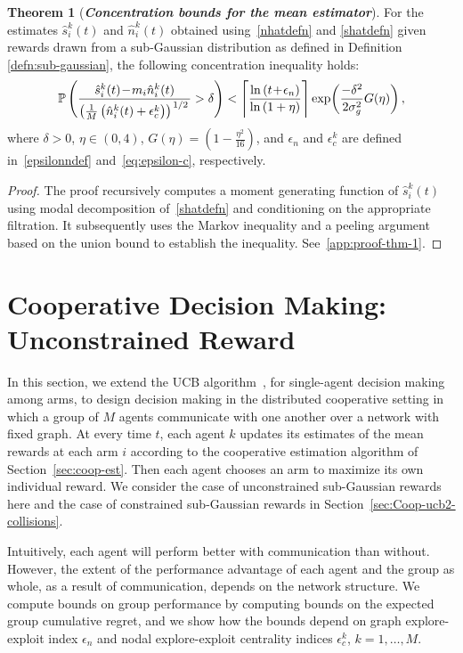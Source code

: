 \documentclass[final,5p,times,twocolumn]{elsarticle}
\theoremstyle{definition}
\newtheorem{theorem}{Theorem}
\newcommand{\slfrac}[2]{\left.#1\middle/#2\right.}
\newcommand{\lnn}[1]{%
	\ln  \left(#1\right)%
}
\newcommand{\expp}[1]{%
	\exp \! \left(#1\right)%
}
\newcommand\bit[1]{\textit{\textbf{#1}}}
\begin{document}
\begin{theorem}[\bit{Concentration bounds for the mean estimator}] \label{thm:EstDevBoudnsCondensed}
	For the estimates	$\hat{s}_i^k(t)$ and $\hat{n}_i^k(t)$ obtained using~\eqref{nhatdefn} and \eqref{shatdefn} given rewards drawn from a sub-Gaussian distribution as defined in Definition \ref{defn:sub-gaussian}, the following concentration inequality holds: 
	\begin{equation}
		\mathbb{P} \left( \frac{\hat{s}_i^k(t) \!-\! m_i \hat{n}_i^k(t)}{\left(\frac{1}{M} \left(\hat{n}_i^k(t) + \epsilon_c^k\right)\right)^{\slfrac{1}{2}}} > \delta  \right) <\Bigg\lceil \frac{\lnn{t \!+\! \epsilon_n}}{\lnn{1 + \eta}} \Bigg\rceil  \expp{\frac{-\delta^2}{2 \sigma_g^2} G(\eta) } ,
	\end{equation}
	where 	$\delta > 0$, $\eta \in (0,4)$, $G(\eta) = (1-\frac{\eta^2}{16})$, and $\epsilon_n$ and $\epsilon_c^k$  are defined in~\eqref{epsilonndef} and~\eqref{eq:epsilon-c}, respectively. 
\end{theorem}
\begin{proof}
The proof recursively computes a moment generating function of $\hat s_i^k(t)$ using modal decomposition of~\eqref{shatdefn} and conditioning on the appropriate filtration. It subsequently uses the Markov inequality and a peeling argument based on the union bound to establish the  inequality. See~\ref{app:proof-thm-1}.
\end{proof}

\section{Cooperative Decision Making:   Unconstrained Reward %
}\label{sec:DistributedDecisionMaking}
{In this section, we extend the UCB algorithm~\cite{PA-NCB-PF:02}, for single-agent decision making among arms, to design decision making in the distributed cooperative setting in which a group of $M$ agents communicate with one another over a network with fixed graph. At every time $t$, each agent $k$ updates its estimates of the mean rewards at each arm $i$ according to the cooperative estimation algorithm of Section~\ref{sec:coop-est}. Then each agent chooses an arm to maximize its own individual reward.  We consider the case of unconstrained sub-Gaussian rewards here and the case of constrained sub-Gaussian rewards in Section~\ref{sec:Coop-ucb2-collisions}.  

Intuitively, each agent will perform better with communication than without.  However, the extent of the performance advantage of each agent and  the group as whole, as a result of communication, depends on the network structure. We compute bounds on group performance by computing bounds on the expected group cumulative regret, and we show how the bounds depend on graph explore-exploit index $\epsilon_n$ and nodal explore-exploit centrality indices $\epsilon_c^k$, $k = 1, \ldots, M$.}
\end{document}

